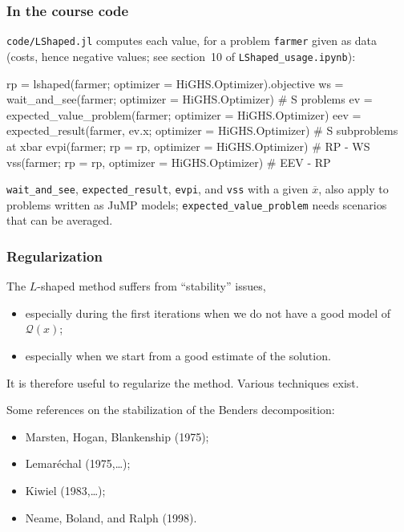 \documentclass[aspectratio=169]{beamer}
\begin{document}
\begin{frame}[fragile]
\frametitle{In the course code}

\texttt{code/LShaped.jl} computes each value, for a problem \texttt{farmer} given as data (costs,
hence negative values; see section~10 of \texttt{LShaped\_usage.ipynb}):

\begin{footnotesize}
\begin{semiverbatim}
rp  = lshaped(farmer; optimizer = HiGHS.Optimizer).objective
ws  = wait_and_see(farmer; optimizer = HiGHS.Optimizer)   # S problems
ev  = expected_value_problem(farmer; optimizer = HiGHS.Optimizer)
eev = expected_result(farmer, ev.x; optimizer = HiGHS.Optimizer)
                                    # S subproblems at xbar
evpi(farmer; rp = rp, optimizer = HiGHS.Optimizer)   # RP - WS
vss(farmer; rp = rp, optimizer = HiGHS.Optimizer)    # EEV - RP
\end{semiverbatim}
\end{footnotesize}

\texttt{wait\_and\_see}, \texttt{expected\_result}, \texttt{evpi}, and \texttt{vss} with a given
$\overline{x}$, also apply to problems written as JuMP models; \texttt{expected\_value\_problem} needs
scenarios that can be averaged.

\end{frame}

\begin{frame}
\frametitle{Regularization}

The $L$-shaped method suffers from ``stability'' issues,
\begin{itemize}
\item
especially during the first iterations when we do not have a good model of $\mathcal{Q}(x)$;
\item
especially when we start from a good estimate of the solution.
\end{itemize}
It is therefore useful to {\red regularize} the method. Various techniques exist.

\mbox{}

{\blue Some references} on the stabilization of the Benders decomposition:
\begin{itemize}
\item
Marsten, Hogan, Blankenship (1975);
\item
Lemaréchal (1975,\ldots);
\item
Kiwiel (1983,\ldots);
\item
Neame, Boland, and Ralph (1998).
\end{itemize}

\end{frame}
\end{document}

